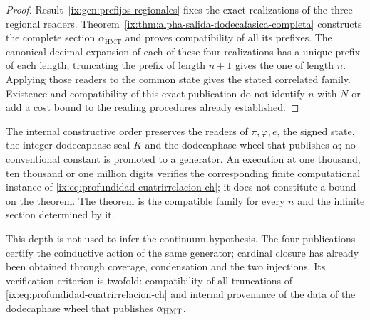 \begin{proof}
Result~\ref{ix:gen:prefijos-regionales} fixes the exact realizations
of the three regional readers.
Theorem~\ref{ix:thm:alpha-salida-dodecafasica-completa} constructs the complete
section \(\alpha_{\mathrm{HMT}}\) and proves compatibility of all its
prefixes. The canonical decimal expansion of each of these
four realizations has a unique prefix of each length; truncating the
prefix of length \(n+1\) gives the one of length \(n\). Applying those readers
to the common state gives the stated correlated family. Existence and
compatibility of this exact publication do not identify \(n\) with \(N\)
or add a cost bound to the reading procedures already established.
\end{proof}

The internal constructive order preserves the readers of
\(\pi,\varphi,e\), the signed state, the integer dodecaphase seal \(K\) and the
dodecaphase wheel that publishes \(\alpha\); no conventional constant is
promoted to a generator. An execution at one thousand, ten thousand or one million digits
verifies the corresponding finite computational instance of
\eqref{ix:eq:profundidad-cuatrirrelacion-ch}; it does not constitute a bound on the
theorem. The theorem is the compatible family for every \(n\) and the infinite
section determined by it.

This depth is not used to infer the continuum hypothesis. The four publications
certify the coinductive action of the same generator; cardinal closure has already been
obtained through coverage, condensation and the two injections. Its
verification criterion is twofold: compatibility of all truncations
of \eqref{ix:eq:profundidad-cuatrirrelacion-ch} and internal provenance of the
data of the dodecaphase wheel that publishes \(\alpha_{\rm HMT}\).
